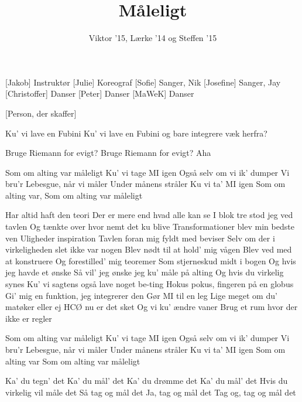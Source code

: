\documentclass[a4paper,11pt]{article}
\title{Måleligt}
\author{Viktor '15, Lærke '14 og Steffen '15}
\begin{document}
\maketitle

\begin{roles}
[Jakob] Instruktør
[Julie] Koreograf
[Sofie] Sanger, Nik
[Josefine] Sanger, Jay
[Christoffer] Danser
[Peter] Danser
[MaWeK] Danser
\end{roles}

\begin{props}
[Person, der skaffer]
\end{props}


\begin{song}
 Ku' vi lave en Fubini
Ku' vi lave en Fubini
og bare integrere væk herfra?

 Bruge Riemann for evigt?
Bruge Riemann for evigt?
Aha
 
 Som om alting var måleligt
Ku' vi tage MI igen
Også selv om vi ik' dumper
Vi bru'r Lebesgue, når vi måler
Under månens stråler
Ku vi ta’ MI igen
Som om alting var,
Som om alting var måleligt

 Har altid haft den teori
Der er mere end hvad alle kan se
I blok tre stod jeg ved tavlen 
Og tænkte over hvor nemt det ku blive
 Transformationer blev min bedste ven
Uligheder inspiration
Tavlen foran mig fyldt med beviser
Selv om der i virkeligheden slet ikke var nogen
 Blev nødt til at hold' mig vågen
Blev ved med at konstruere
Og forestilled' mig teoremer
Som stjerneskud midt i bogen
 Og hvis jeg havde et ønske
 Så vil' jeg ønske jeg ku' måle på alting
 Og hvis du virkelig synes
 Ku' vi sagtens også lave noget be-ting
 Hokus pokus, fingeren på en globus
 Gi' mig en funktion, jeg integrerer den
 Gør MI til en leg
Lige meget om du' matøker eller ej
  HCØ nu er det sket 
 Og vi ku' ændre vaner
 Brug et rum hvor der ikke er regler

 Som om alting var måleligt
Ku' vi tage MI igen
Også selv om vi ik' dumper
Vi bru'r Lebesgue, når vi måler
Under månens stråler
Ku vi ta’ MI igen
Som om alting var
Som om alting var måleligt


 Ka' du tegn' det
Ka' du mål' det
 Ka' du drømme det
Ka' du mål' det
 Hvis du virkelig vil måle det
Så tag og mål det
Ja, tag og mål det
Tag og, tag og mål det


\end{song}
\end{document}
